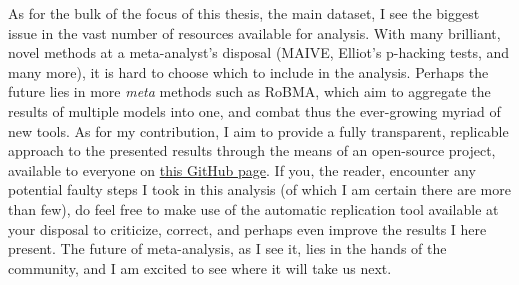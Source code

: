 As for the bulk of the focus of this thesis, the main dataset, I see the biggest issue in the vast number of resources available for analysis. With many brilliant, novel methods at a meta-analyst's disposal (MAIVE, Elliot's p-hacking tests, and many more), it is hard to choose which to include in the analysis. Perhaps the future lies in more \textit{meta} methods such as RoBMA, which aim to aggregate the results of multiple models into one, and combat thus the ever-growing myriad of new tools. As for my contribution, I aim to provide a fully transparent, replicable approach to the presented results through the means of an open-source project, available to everyone on \href{https://github.com/PetrCala/Diploma-Thesis}{this GitHub page}. If you, the reader, encounter any potential faulty steps I took in this analysis (of which I am certain there are more than few), do feel free to make use of the automatic replication tool available at your disposal to criticize, correct, and perhaps even improve the results I here present. The future of meta-analysis, as I see it, lies in the hands of the community, and I am excited to see where it will take us next.

